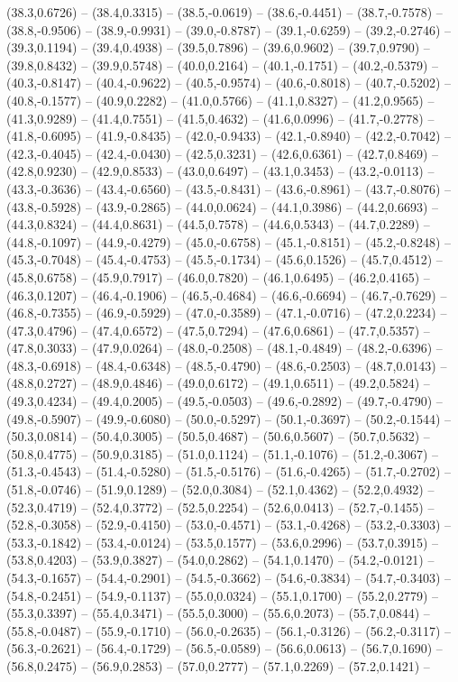 \documentclass{SVnote}
\begin{document}
(38.3,0.6726) -- (38.4,0.3315) -- (38.5,-0.0619) -- (38.6,-0.4451) -- (38.7,-0.7578) -- (38.8,-0.9506) -- (38.9,-0.9931) -- (39.0,-0.8787) -- (39.1,-0.6259) -- (39.2,-0.2746) -- (39.3,0.1194) -- (39.4,0.4938) -- (39.5,0.7896) -- (39.6,0.9602) -- (39.7,0.9790) -- (39.8,0.8432) -- (39.9,0.5748) -- (40.0,0.2164) -- (40.1,-0.1751) -- (40.2,-0.5379) -- (40.3,-0.8147) -- (40.4,-0.9622) -- (40.5,-0.9574) -- (40.6,-0.8018) -- (40.7,-0.5202) -- (40.8,-0.1577) -- (40.9,0.2282) -- (41.0,0.5766) -- (41.1,0.8327) -- (41.2,0.9565) -- (41.3,0.9289) -- (41.4,0.7551) -- (41.5,0.4632) -- (41.6,0.0996) -- (41.7,-0.2778) -- (41.8,-0.6095) -- (41.9,-0.8435) -- (42.0,-0.9433) -- (42.1,-0.8940) -- (42.2,-0.7042) -- (42.3,-0.4045) -- (42.4,-0.0430) -- (42.5,0.3231) -- (42.6,0.6361) -- (42.7,0.8469) -- (42.8,0.9230) -- (42.9,0.8533) -- (43.0,0.6497) -- (43.1,0.3453) -- (43.2,-0.0113) -- (43.3,-0.3636) -- (43.4,-0.6560) -- (43.5,-0.8431) -- (43.6,-0.8961) -- (43.7,-0.8076) -- (43.8,-0.5928) -- (43.9,-0.2865) -- (44.0,0.0624) -- (44.1,0.3986) -- (44.2,0.6693) -- (44.3,0.8324) -- (44.4,0.8631) -- (44.5,0.7578) -- (44.6,0.5343) -- (44.7,0.2289) -- (44.8,-0.1097) -- (44.9,-0.4279) -- (45.0,-0.6758) -- (45.1,-0.8151) -- (45.2,-0.8248) -- (45.3,-0.7048) -- (45.4,-0.4753) -- (45.5,-0.1734) -- (45.6,0.1526) -- (45.7,0.4512) -- (45.8,0.6758) -- (45.9,0.7917) -- (46.0,0.7820) -- (46.1,0.6495) -- (46.2,0.4165) -- (46.3,0.1207) -- (46.4,-0.1906) -- (46.5,-0.4684) -- (46.6,-0.6694) -- (46.7,-0.7629) -- (46.8,-0.7355) -- (46.9,-0.5929) -- (47.0,-0.3589) -- (47.1,-0.0716) -- (47.2,0.2234) -- (47.3,0.4796) -- (47.4,0.6572) -- (47.5,0.7294) -- (47.6,0.6861) -- (47.7,0.5357) -- (47.8,0.3033) -- (47.9,0.0264) -- (48.0,-0.2508) -- (48.1,-0.4849) -- (48.2,-0.6396) -- (48.3,-0.6918) -- (48.4,-0.6348) -- (48.5,-0.4790) -- (48.6,-0.2503) -- (48.7,0.0143) -- (48.8,0.2727) -- (48.9,0.4846) -- (49.0,0.6172) -- (49.1,0.6511) -- (49.2,0.5824) -- (49.3,0.4234) -- (49.4,0.2005) -- (49.5,-0.0503) -- (49.6,-0.2892) -- (49.7,-0.4790) -- (49.8,-0.5907) -- (49.9,-0.6080) -- (50.0,-0.5297) -- (50.1,-0.3697) -- (50.2,-0.1544) -- (50.3,0.0814) -- (50.4,0.3005) -- (50.5,0.4687) -- (50.6,0.5607) -- (50.7,0.5632) -- (50.8,0.4775) -- (50.9,0.3185) -- (51.0,0.1124) -- (51.1,-0.1076) -- (51.2,-0.3067) -- (51.3,-0.4543) -- (51.4,-0.5280) -- (51.5,-0.5176) -- (51.6,-0.4265) -- (51.7,-0.2702) -- (51.8,-0.0746) -- (51.9,0.1289) -- (52.0,0.3084) -- (52.1,0.4362) -- (52.2,0.4932) -- (52.3,0.4719) -- (52.4,0.3772) -- (52.5,0.2254) -- (52.6,0.0413) -- (52.7,-0.1455) -- (52.8,-0.3058) -- (52.9,-0.4150) -- (53.0,-0.4571) -- (53.1,-0.4268) -- (53.2,-0.3303) -- (53.3,-0.1842) -- (53.4,-0.0124) -- (53.5,0.1577) -- (53.6,0.2996) -- (53.7,0.3915) -- (53.8,0.4203) -- (53.9,0.3827) -- (54.0,0.2862) -- (54.1,0.1470) -- (54.2,-0.0121) -- (54.3,-0.1657) -- (54.4,-0.2901) -- (54.5,-0.3662) -- (54.6,-0.3834) -- (54.7,-0.3403) -- (54.8,-0.2451) -- (54.9,-0.1137) -- (55.0,0.0324) -- (55.1,0.1700) -- (55.2,0.2779) -- (55.3,0.3397) -- (55.4,0.3471) -- (55.5,0.3000) -- (55.6,0.2073) -- (55.7,0.0844) -- (55.8,-0.0487) -- (55.9,-0.1710) -- (56.0,-0.2635) -- (56.1,-0.3126) -- (56.2,-0.3117) -- (56.3,-0.2621) -- (56.4,-0.1729) -- (56.5,-0.0589) -- (56.6,0.0613) -- (56.7,0.1690) -- (56.8,0.2475) -- (56.9,0.2853) -- (57.0,0.2777) -- (57.1,0.2269) -- (57.2,0.1421) -- 
\end{document}
